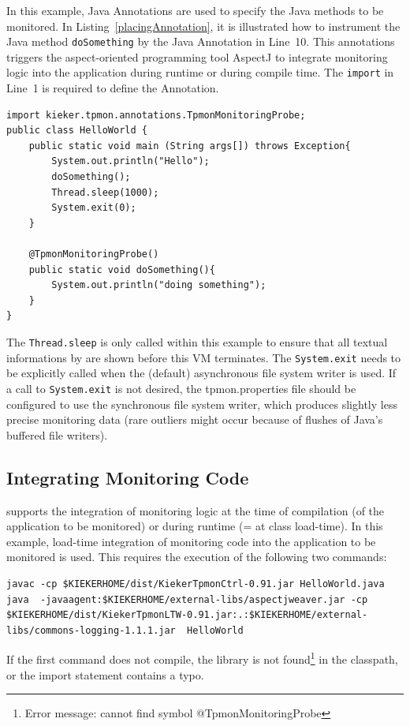 \documentclass[a4paper,12pt]{scrartcl}
\begin{document}
In this example, Java Annotations are used to specify the Java methods to be monitored. In Listing~\ref{placingAnnotation}, it is illustrated how to instrument the Java method \texttt{doSomething} by the Java Annotation in Line~10. This annotations triggers the aspect-oriented programming tool AspectJ to integrate monitoring logic into the application during runtime or during compile time. The \texttt{import} in Line~1 is required to define the Annotation.

\begin{lstlisting}[caption={Lines 1 and 10 are added to instrument this simple ``Hello World'' Java program.},label={placingAnnotation}]
import kieker.tpmon.annotations.TpmonMonitoringProbe;
public class HelloWorld {
	public static void main (String args[]) throws Exception{
		System.out.println("Hello");
		doSomething();
		Thread.sleep(1000);
		System.exit(0);
	}

	@TpmonMonitoringProbe()
	public static void doSomething(){
		System.out.println("doing something");
	}
}
\end{lstlisting}

The \texttt{Thread.sleep} is only called within this example to ensure that all textual informations by \tpmon{} are shown before this VM terminates. The \texttt{System.exit} needs to be explicitly called when the (default) asynchronous file system writer is used. If a call to \texttt{System.exit} is not desired, the tpmon.properties file should be configured to use the synchronous file system writer, which produces slightly less precise monitoring data (rare outliers might occur because of flushes of Java's buffered file writers).

\subsection{Integrating Monitoring Code}
\tpmon{} supports the integration of monitoring logic at the time of compilation (of the application to be monitored) or during runtime (= at class load-time). In this example, load-time integration of monitoring code into the application to be monitored is used. This requires the execution of the following two commands:

\begin{lstlisting}[caption={Compilation and execution with AspectJ's Java agent.},label={javaHelloWorld}]
javac -cp $KIEKERHOME/dist/KiekerTpmonCtrl-0.91.jar HelloWorld.java
java  -javaagent:$KIEKERHOME/external-libs/aspectjweaver.jar -cp $KIEKERHOME/dist/KiekerTpmonLTW-0.91.jar:.:$KIEKERHOME/external-libs/commons-logging-1.1.1.jar  HelloWorld
\end{lstlisting}
If the first command does not compile, the \tpmon{} library is not found\footnote{Error message: cannot find symbol @TpmonMonitoringProbe} in the classpath, or the import statement contains a typo.
\end{document}
